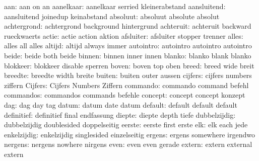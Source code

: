                aan:  aan                  on                  an
          aanelkaar:  aanelkaar            serried             kleinerabstand
        aansluitend:  aansluitend          joinedup            keinabstand
           absoluut:  absoluut             absolute            absolut
        achtergrond:  achtergrond          background          hintergrund
          achteruit:  achteruit            backward            rueckwaerts
              actie:  actie                action              aktion
          afsluiter:  afsluiter            stopper             trenner
              alles:  alles                all                 alles
             altijd:  altijd               always              immer
          autointro:  autointro            autointro           autointro
              beide:  beide                both                beide
             binnen:  binnen               inner               innen
             blanko:  blanko               blank               blanko
           blokkeer:  blokkeer             disable             sperren
              boven:  boven                top                 oben
              breed:  breed                wide                breit
            breedte:  breedte              width               breite
             buiten:  buiten               outer               aussen
            cijfers:  cijfers              numbers             ziffern
            Cijfers:  Cijfers              Numbers             Ziffern
           commando:  commando             command             befehl
          commandos:  commandos            commands            befehle
            concept:  concept              concept             konzept
                dag:  dag                  day                 tag
              datum:  datum                date                datum
            default:  default              default             default
         definitief:  definitief           final               endfassung
             diepte:  diepte               depth               tiefe
       dubbelzijdig:  dubbelzijdig         doublesided         doppelseitig
             eerste:  eerste               first               erste
                elk:  elk                  each                jede
        enkelzijdig:  enkelzijdig          singlesided         einzelseitig
             ergens:  ergens               somewhere           irgendwo
            nergens:  nergens              nowhere             nirgens
               even:  even                 even                gerade
             extern:  extern               external            extern
